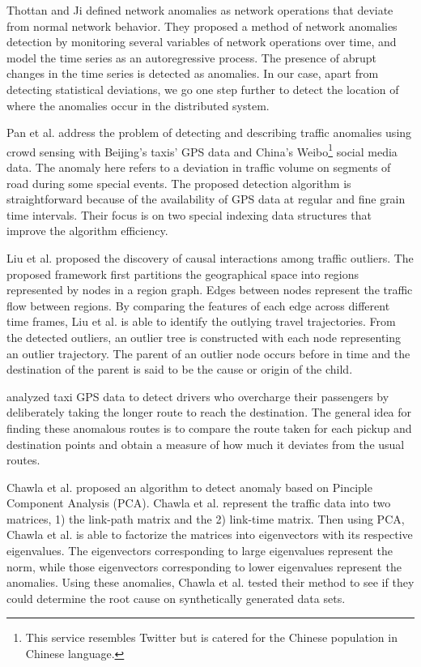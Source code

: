 \documentclass[conference]{IEEEtran.1.8}
\begin{document}
Thottan and Ji \cite{Thottan2003} defined network anomalies as network operations that deviate from normal network behavior. They proposed a method of network anomalies detection by monitoring several variables of network operations over time, and model the time series as an autoregressive process. The presence of abrupt changes in the time series is detected as anomalies. In our case, apart from detecting statistical deviations, we go one step further to detect the location of where the anomalies occur in the distributed system.

Pan et al. \cite{Pan2013} address the problem of detecting and describing traffic anomalies using crowd sensing with Beijing's taxis' GPS data and China's Weibo\footnote{This service resembles Twitter but is catered for the Chinese population in Chinese language.} social media data. The anomaly here refers to a deviation in traffic volume on segments of road during some special events. The proposed detection algorithm is straightforward because of the availability of GPS data at regular and fine grain time intervals. Their focus is on two special indexing data structures that improve the algorithm efficiency.

Liu et al. \cite{Liu2011} proposed the discovery of causal interactions among traffic outliers. The proposed framework first partitions the geographical space into regions represented by nodes in a region graph. Edges between nodes represent the traffic flow between regions. By comparing the features of each edge across different time frames, Liu et al. is able to identify the outlying travel trajectories. From the detected outliers, an outlier tree is constructed with each node representing an outlier trajectory. The parent of an outlier node occurs before in time and the destination of the parent is said to be the cause or origin of the child.

\cite{Ge2011,Zhang2011,Zhang2012} analyzed taxi GPS data to detect drivers who overcharge their passengers by deliberately taking the longer route to reach the destination. The general idea for finding these anomalous routes is to compare the route taken for each pickup and destination points and obtain a measure of how much it deviates from the usual routes.

Chawla et al. \cite{Chawla2012} proposed an algorithm to detect anomaly based on Pinciple Component Analysis (PCA). Chawla et al. \cite{Chawla2012} represent the traffic data into two matrices, 1) the link-path matrix and the 2) link-time matrix. Then using PCA, Chawla et al. \cite{Chawla2012} is able to factorize the matrices into eigenvectors with its respective eigenvalues. The eigenvectors corresponding to large eigenvalues represent the norm, while those eigenvectors corresponding to lower eigenvalues represent the anomalies. Using these anomalies, Chawla et al. \cite{Chawla2012} tested their method to see if they could determine the root cause on synthetically generated data sets.
\end{document}
